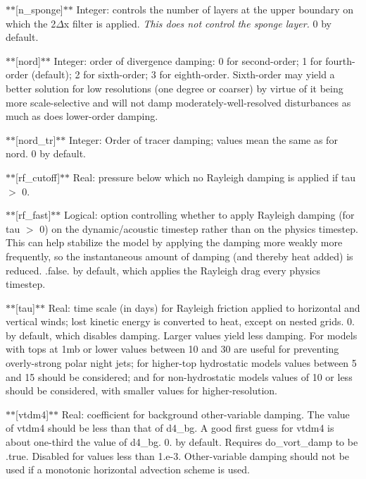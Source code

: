 $\ast$$\ast$\mbox{[}n\-\_\-sponge\mbox{]}$\ast$$\ast$ Integer\-: controls the number of layers at the upper boundary on which the 2{$\Delta$}x filter is applied. {\itshape This does not control the sponge layer.} 0 by default.

$\ast$$\ast$\mbox{[}nord\mbox{]}$\ast$$\ast$ Integer\-: order of divergence damping\-: 0 for second-\/order; 1 for fourth-\/order (default); 2 for sixth-\/order; 3 for eighth-\/order. Sixth-\/order may yield a better solution for low resolutions (one degree or coarser) by virtue of it being more scale-\/selective and will not damp moderately-\/well-\/resolved disturbances as much as does lower-\/order damping.

$\ast$$\ast$\mbox{[}nord\-\_\-tr\mbox{]}$\ast$$\ast$ Integer\-: Order of tracer damping; values mean the same as for nord. 0 by default.

$\ast$$\ast$\mbox{[}rf\-\_\-cutoff\mbox{]}$\ast$$\ast$ Real\-: pressure below which no Rayleigh damping is applied if tau $>$ 0.

$\ast$$\ast$\mbox{[}rf\-\_\-fast\mbox{]}$\ast$$\ast$ Logical\-: option controlling whether to apply Rayleigh damping (for tau $>$ 0) on the dynamic/acoustic timestep rather than on the physics timestep. This can help stabilize the model by applying the damping more weakly more frequently, so the instantaneous amount of damping (and thereby heat added) is reduced. .false. by default, which applies the Rayleigh drag every physics timestep.

$\ast$$\ast$\mbox{[}tau\mbox{]}$\ast$$\ast$ Real\-: time scale (in days) for Rayleigh friction applied to horizontal and vertical winds; lost kinetic energy is converted to heat, except on nested grids. 0. by default, which disables damping. Larger values yield less damping. For models with tops at 1mb or lower values between 10 and 30 are useful for preventing overly-\/strong polar night jets; for higher-\/top hydrostatic models values between 5 and 15 should be considered; and for non-\/hydrostatic models values of 10 or less should be considered, with smaller values for higher-\/resolution.

$\ast$$\ast$\mbox{[}vtdm4\mbox{]}$\ast$$\ast$ Real\-: coefficient for background other-\/variable damping. The value of vtdm4 should be less than that of d4\-\_\-bg. A good first guess for vtdm4 is about one-\/third the value of d4\-\_\-bg. 0. by default. Requires do\-\_\-vort\-\_\-damp to be .true. Disabled for values less than 1.\-e-\/3. Other-\/variable damping should not be used if a monotonic horizontal advection scheme is used.

